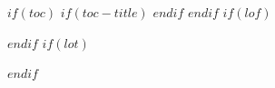$if(toc)$
$if(toc-title)$
\renewcommand*\contentsname{$toc-title$}
$endif$
\setcounter{tocdepth}{$toc-depth$}
\tableofcontents
$endif$
$if(lof)$
\listoffigures
$endif$
$if(lot)$
\listoftables
$endif$
\mainmatter %
\pagestyle{corpus}
